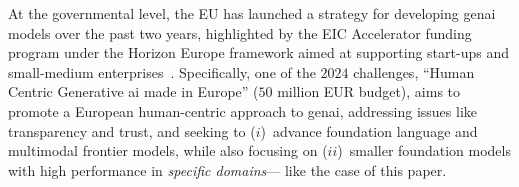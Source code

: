At the governmental level, the EU has launched a strategy for developing \gls{genai} models over the past two years, highlighted by the EIC Accelerator funding program under the Horizon Europe framework aimed at supporting start-ups and small-medium enterprises~\cite{eic}.
Specifically, one of the $2024$ challenges,
``Human Centric Generative \gls{ai} made in Europe'' ($50$ million EUR budget), aims to promote a European human-centric approach to \gls{genai}, addressing issues like transparency and trust, and seeking to 
($i$)~advance foundation language and multimodal frontier models, while also focusing on 
($ii$)~smaller foundation models with high performance in \emph{specific domains}---%
like the case of this paper.




















